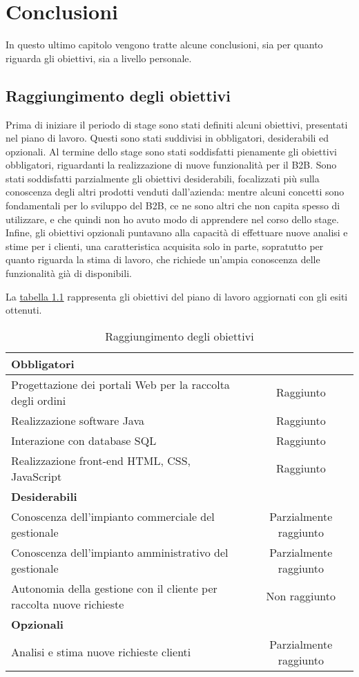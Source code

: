 \chapter{Conclusioni}
\begin{flushright}
	\parbox{13cm}{\small In questo ultimo capitolo vengono tratte alcune conclusioni, sia per quanto riguarda gli obiettivi, sia a livello personale.}
\end{flushright}
\section{Raggiungimento degli obiettivi}
Prima di iniziare il periodo di stage sono stati definiti alcuni obiettivi, presentati nel piano di lavoro. Questi sono stati suddivisi in obbligatori, desiderabili ed opzionali. Al termine dello stage sono stati soddisfatti pienamente gli obiettivi obbligatori, riguardanti la realizzazione di nuove funzionalità per il B2B. Sono stati soddisfatti parzialmente gli obiettivi desiderabili, focalizzati più sulla conoscenza degli altri prodotti venduti dall'azienda: mentre alcuni concetti sono fondamentali per lo sviluppo del B2B, ce ne sono altri che non capita spesso di utilizzare, e che quindi non ho avuto modo di apprendere nel corso dello stage. Infine, gli obiettivi opzionali puntavano alla capacità di effettuare nuove analisi e stime per i clienti, una caratteristica acquisita solo in parte, sopratutto per quanto riguarda la stima di lavoro, che richiede un'ampia conoscenza delle funzionalità già di disponibili.

La \hyperref[tab:obiettivi-2]{tabella \ref{tab:obiettivi-2}} rappresenta gli obiettivi del piano di lavoro aggiornati con gli esiti ottenuti.
\begin{table}
	\centering
	\begin{tabular}{|m{9.3cm}|c|}
		\hline
		\multicolumn{2}{|l|}{\textbf{Obbligatori}} \\
		\hline
		Progettazione dei portali Web per la raccolta degli ordini & Raggiunto \\
		\hline
		Realizzazione software Java & Raggiunto \\
		\hline
		Interazione con database SQL & Raggiunto \\
		\hline
		Realizzazione front-end HTML, CSS, JavaScript & Raggiunto \\
		\hline
		\multicolumn{2}{|l|}{\textbf{Desiderabili}}\\
		\hline
		Conoscenza dell'impianto commerciale del gestionale & Parzialmente raggiunto \\
		\hline
		Conoscenza dell'impianto amministrativo del gestionale & Parzialmente raggiunto \\
		\hline
		Autonomia della gestione con il cliente per raccolta nuove richieste & Non raggiunto \\
		\hline
		\multicolumn{2}{|l|}{\textbf{Opzionali}} \\
		\hline
		Analisi e stima nuove richieste clienti & Parzialmente raggiunto \\
		\hline
	\end{tabular}
	\caption{Raggiungimento degli obiettivi}
	\label{tab:obiettivi-2}
\end{table}

